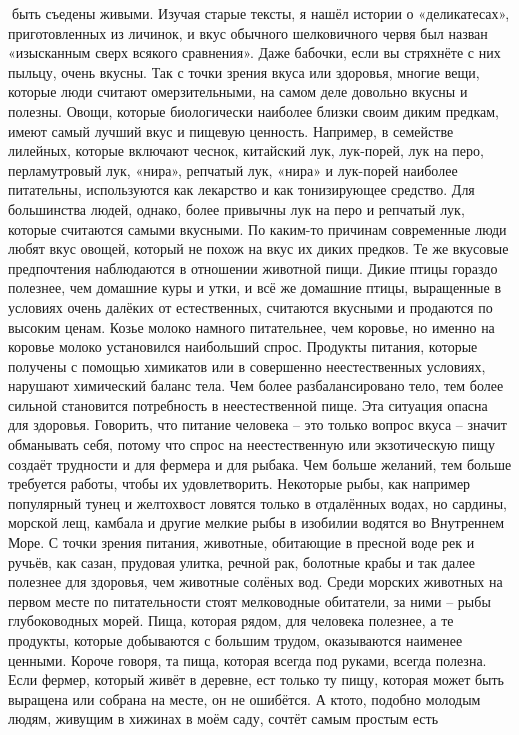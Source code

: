 \documentclass[a4paper]{book}
\begin{document}
быть съедены живыми. Изучая старые тексты, я нашёл истории о «деликатесах»,
приготовленных из личинок, и вкус обычного шелковичного червя был назван «изысканным
сверх всякого сравнения». Даже бабочки, если вы стряхнёте с них пыльцу, очень вкусны.
Так с точки зрения вкуса или здоровья, многие вещи, которые люди считают
омерзительными, на самом деле довольно вкусны и полезны.
Овощи, которые биологически наиболее близки своим диким предкам, имеют самый
лучший вкус и пищевую ценность. Например, в семействе лилейных, которые включают
чеснок, китайский лук, лук-порей, лук на перо, перламутровый лук, «нира», репчатый лук,
«нира» и лук-порей наиболее питательны, используются как лекарство и как тонизирующее
средство. Для большинства людей, однако, более привычны лук на перо и репчатый лук,
которые считаются самыми вкусными. По каким-то причинам современные люди любят
вкус овощей, который не похож на вкус их диких предков.
Те же вкусовые предпочтения наблюдаются в отношении животной пищи. Дикие птицы
гораздо полезнее, чем домашние куры и утки, и всё же домашние птицы, выращенные в
условиях очень далёких от естественных, считаются вкусными и продаются по высоким
ценам. Козье молоко намного питательнее, чем коровье, но именно на коровье молоко
установился наибольший спрос. Продукты питания, которые получены с помощью
химикатов или в совершенно неестественных условиях, нарушают химический баланс тела.
Чем более разбалансировано тело, тем более сильной становится потребность в
неестественной пище. Эта ситуация опасна для здоровья.
Говорить, что питание человека – это только вопрос вкуса – значит обманывать себя,
потому что спрос на неестественную или экзотическую пищу создаёт трудности и для
фермера и для рыбака. Чем больше желаний, тем больше требуется работы, чтобы их
удовлетворить. Некоторые рыбы, как например популярный тунец и желтохвост ловятся
только в отдалённых водах, но сардины, морской лещ, камбала и другие мелкие рыбы в
изобилии водятся во Внутреннем Море. С точки зрения питания, животные, обитающие в
пресной воде рек и ручьёв, как сазан, прудовая улитка, речной рак, болотные крабы и так
далее полезнее для здоровья, чем животные солёных вод. Среди морских животных на
первом месте по питательности стоят мелководные обитатели, за ними – рыбы
глубоководных морей. Пища, которая рядом, для человека полезнее, а те продукты, которые
добываются с большим трудом, оказываются наименее ценными. Короче говоря, та пища,
которая всегда под руками, всегда полезна. Если фермер, который живёт в деревне, ест
только ту пищу, которая может быть выращена или собрана на месте, он не ошибётся. А ктото, подобно молодым людям, живущим в хижинах в моём саду, сочтёт самым простым есть
\end{document}
